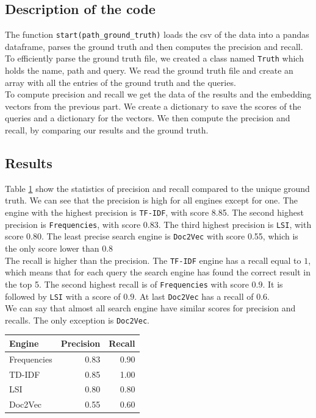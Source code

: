 \documentclass [14 pt]{article}
\begin{document}
\subsection{Description of the code} %
The function \texttt{start(path\_ground\_truth)} loads the csv of the data  into a pandas dataframe, parses the ground truth and then computes the precision and recall.\\
To efficiently parse the ground truth file, we created a class named \texttt{Truth} which holds the name, path and query. We read the ground truth file and create an array with all the entries of the ground truth and the queries.\\
To compute precision and recall we get the data of the results and the embedding vectors from the previous part. We create a dictionary to save the scores of the queries and a dictionary for the vectors. We then compute the precision and recall, by comparing our results and the ground truth.

\subsection{Results} %
Table \ref{tab:Evaluation} show the statistics of precision and recall compared to the unique ground truth.
We can see that the precision is high for all engines except for one. The engine with the highest precision is \texttt{TF-IDF}, with score 8.85.
The second highest precision is \texttt{Frequencies}, with score 0.83.
The third highest precision is \texttt{LSI}, with score 0.80.
The least precise search engine is \texttt{Doc2Vec} with score 0.55, which is the only score lower than $0.8$\\
The recall is higher than the precision. The \texttt{TF-IDF} engine has a recall equal to $1$, which means that for each query the search engine has found the correct result in the top 5. The second highest recall is of \texttt{Frequencies} with score $0.9$. It is followed by \texttt{LSI} with a score of $0.9$. At last \texttt{Doc2Vec} has a recall of $0.6$.\\
We can say that almost all search engine have similar scores for precision and recalls. The only exception is \texttt{Doc2Vec}.\\

\begin{table}[h]
\centering
\begin{tabular}{| l r r |}
\hline
\textbf{Engine}	&  \textbf{Precision}	&  \textbf{Recall}	\\ \hline\hline
Frequencies 		&	0.83	&	0.90	\\
TD-IDF			&	0.85	&	1.00	\\
LSI				&	0.80	&	0.80	\\
Doc2Vec			&	0.55	&	0.60	\\ \hline
\end{tabular}
\label{tab:Evaluation}
\end{table}
\end{document}
